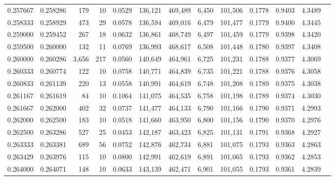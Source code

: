 \begin{tabular}{rrrrrrrrrrrrr}
0.257667 & 0.258286 &   179 &  10 &                                     0.0529 & 136,121 & 469,489 &   6,450 & 101,506 & 0.1778 & 0.9403 & 4.3489 \\
0.258333 & 0.258929 &   473 &  29 &                                     0.0578 & 136,594 & 469,016 &   6,479 & 101,477 & 0.1779 & 0.9400 & 4.3445 \\
0.259000 & 0.259452 &   267 &  18 &                                     0.0632 & 136,861 & 468,749 &   6,497 & 101,459 & 0.1779 & 0.9398 & 4.3420 \\
0.259500 & 0.260000 &   132 &  11 &                                     0.0769 & 136,993 & 468,617 &   6,508 & 101,448 & 0.1780 & 0.9397 & 4.3408 \\
0.260000 & 0.260286 & 3,656 & 217 &                                     0.0560 & 140,649 & 464,961 &   6,725 & 101,231 & 0.1788 & 0.9377 & 4.3069 \\
0.260333 & 0.260774 &   122 &  10 &                                     0.0758 & 140,771 & 464,839 &   6,735 & 101,221 & 0.1788 & 0.9376 & 4.3058 \\
0.260833 & 0.261139 &   220 &  13 &                                     0.0558 & 140,991 & 464,619 &   6,748 & 101,208 & 0.1789 & 0.9375 & 4.3038 \\
0.261167 & 0.261619 &    84 &  10 &                                     0.1064 & 141,075 & 464,535 &   6,758 & 101,198 & 0.1789 & 0.9374 & 4.3030 \\
0.261667 & 0.262000 &   402 &  32 &                                     0.0737 & 141,477 & 464,133 &   6,790 & 101,166 & 0.1790 & 0.9371 & 4.2993 \\
0.262000 & 0.262500 &   183 &  10 &                                     0.0518 & 141,660 & 463,950 &   6,800 & 101,156 & 0.1790 & 0.9370 & 4.2976 \\
0.262500 & 0.263286 &   527 &  25 &                                     0.0453 & 142,187 & 463,423 &   6,825 & 101,131 & 0.1791 & 0.9368 & 4.2927 \\
0.263333 & 0.263381 &   689 &  56 &                                     0.0752 & 142,876 & 462,734 &   6,881 & 101,075 & 0.1793 & 0.9363 & 4.2863 \\
0.263429 & 0.263976 &   115 &  10 &                                     0.0800 & 142,991 & 462,619 &   6,891 & 101,065 & 0.1793 & 0.9362 & 4.2853 \\
0.264000 & 0.264071 &   148 &  10 &                                     0.0633 & 143,139 & 462,471 &   6,901 & 101,055 & 0.1793 & 0.9361 & 4.2839 \\

\end{tabular}
